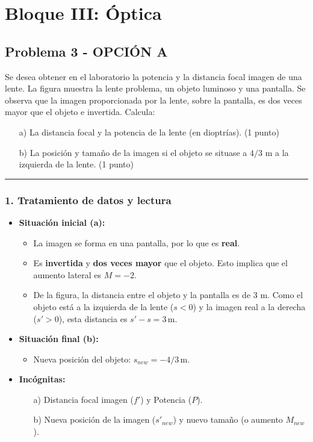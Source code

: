 \newpage
\section{Bloque III: Óptica}
\label{sec:optica_2016_jul_ext}
\subsection{Problema 3 - OPCIÓN A}
\label{subsec:3A_2016_jul_ext}
\begin{cajaenunciado}
Se desea obtener en el laboratorio la potencia y la distancia focal imagen de una lente. La figura muestra la lente problema, un objeto luminoso y una pantalla. Se observa que la imagen proporcionada por la lente, sobre la pantalla, es dos veces mayor que el objeto e invertida. Calcula:
\begin{enumerate}
    \item[a)] La distancia focal y la potencia de la lente (en dioptrías). (1 punto)
    \item[b)] La posición y tamaño de la imagen si el objeto se situase a $4/3$ m a la izquierda de la lente. (1 punto)
\end{enumerate}
\end{cajaenunciado}
\hrule

\subsubsection*{1. Tratamiento de datos y lectura}
\begin{itemize}
    \item \textbf{Situación inicial (a):}
        \begin{itemize}
            \item La imagen se forma en una pantalla, por lo que es \textbf{real}.
            \item Es \textbf{invertida} y \textbf{dos veces mayor} que el objeto. Esto implica que el aumento lateral es $M = -2$.
            \item De la figura, la distancia entre el objeto y la pantalla es de 3 m. Como el objeto está a la izquierda de la lente ($s<0$) y la imagen real a la derecha ($s'>0$), esta distancia es $s' - s = 3\,\text{m}$.
        \end{itemize}
    \item \textbf{Situación final (b):}
        \begin{itemize}
            \item Nueva posición del objeto: $s_{new} = -4/3\,\text{m}$.
        \end{itemize}
    \item \textbf{Incógnitas:}
        \begin{itemize}
            \item[a)] Distancia focal imagen ($f'$) y Potencia ($P$).
            \item[b)] Nueva posición de la imagen ($s'_{new}$) y nuevo tamaño (o aumento $M_{new}$).
        \end{itemize}
\end{itemize}

